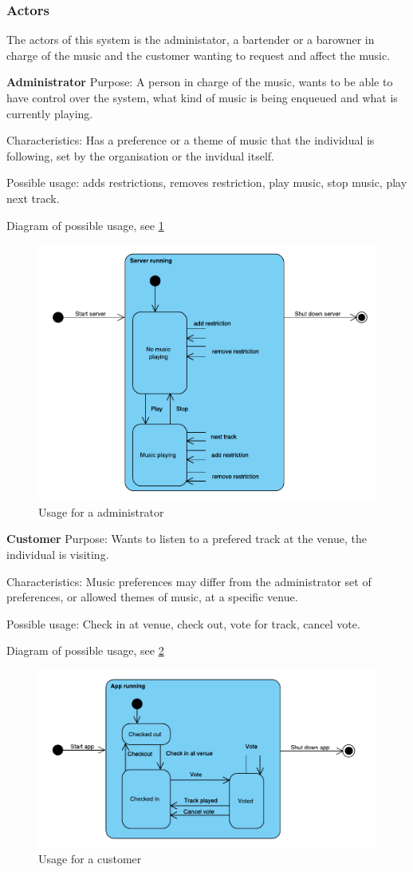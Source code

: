 \subsubsection{Actors}
The actors of this system is the administator, a bartender or a barowner in charge of the music and the customer wanting to request and affect the music.

\textbf{Administrator}
Purpose:
A person in charge of the music, wants to be able to have control over the system, what kind of music is being enqueued and what is currently playing.


Characteristics:
Has a preference or a theme of music that the individual is following, set by the organisation or the invidual itself.

Possible usage:
adds restrictions, removes restriction, play music, stop music, play next track.

Diagram of possible usage, see \cref{fig:UsageAdmin}
\begin{figure}
  \centering
  \includegraphics[width=0.7\linewidth]{Images/UsageAdmin.pdf}
  \caption{Usage for a administrator}
  \label{fig:UsageAdmin}
\end{figure}

\textbf{Customer}
Purpose:
Wants to listen to a prefered track at the venue, the individual is visiting.


Characteristics:
Music preferences may differ from the administrator set of preferences, or allowed themes of music, at a specific venue.

Possible usage:
Check in at venue, check out, vote for track, cancel vote.

Diagram of possible usage, see \cref{fig:UsageUser}
\begin{figure}
  \centering
  \includegraphics[width=0.7\linewidth]{Images/UsageUser.pdf}
  \caption{Usage for a customer}
  \label{fig:UsageUser}
\end{figure}